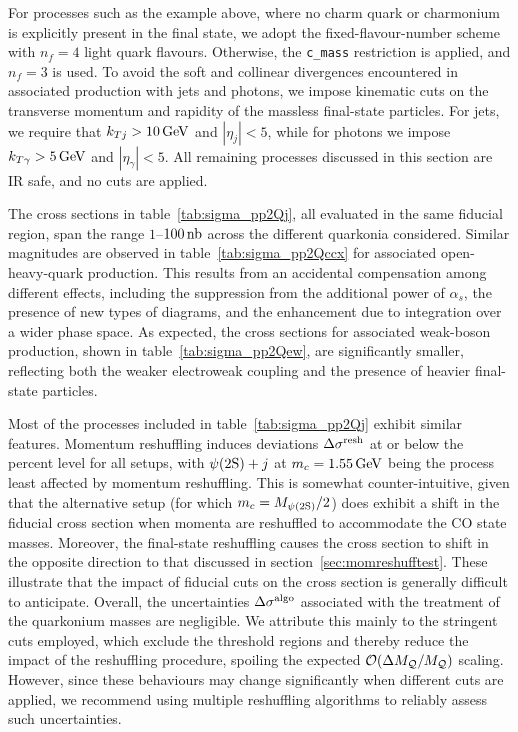 \noindent
For processes such as the example above, where no charm quark or charmonium is explicitly present in the final state, we adopt the fixed-flavour-number scheme with $n_f = 4$ light quark flavours. Otherwise, the {\tt c\_mass} restriction is applied, and $n_f = 3$ is used.
To avoid the soft and collinear divergences encountered in associated production with jets and photons, we impose kinematic cuts on the transverse momentum and rapidity of the massless final-state particles. For jets, we require that $k_{Tj} > 10\,{\rm GeV}$ and $|\eta_j| < 5$, while for photons we impose $k_{T\gamma} > 5\,{\rm GeV}$ and $|\eta_\gamma| < 5$.
All remaining processes discussed in this section are IR safe, and no cuts are applied.

The cross sections in table~\ref{tab:sigma_pp2Qj}, all evaluated in the same fiducial region, span the range $1$--$100\,{\rm nb}$ across the different quarkonia considered. Similar magnitudes are observed in table~\ref{tab:sigma_pp2Qccx} for associated open-heavy-quark production. This results from an accidental compensation among different effects, including the suppression from the additional power of $\alpha_s$, the presence of new types of diagrams, and the enhancement due to integration over a wider phase space.
As expected, the cross sections for associated weak-boson production, shown in table~\ref{tab:sigma_pp2Qew}, are significantly smaller, reflecting both the weaker electroweak coupling and the presence of heavier final-state particles.

Most of the processes included in table~\ref{tab:sigma_pp2Qj} exhibit similar features.
Momentum reshuffling induces deviations 
$\Delta \sigma^{\rm resh}$ at or below the percent level for all setups, with $\psi(2\mathrm{S}) + j$ at $m_c = 1.55\,{\rm GeV}$ being the process least affected by momentum reshuffling. This is somewhat counter-intuitive, given that the alternative setup (for which $m_c = M_{\psi(2\mathrm{S})}/2$) does exhibit a shift in the fiducial cross section when momenta are reshuffled to accommodate the CO state masses. Moreover, the final-state reshuffling causes the cross section to shift in the opposite direction to that discussed in section~\ref{sec:momreshufftest}.
These illustrate that the impact of fiducial cuts on the cross section is generally difficult to anticipate. 
Overall, the uncertainties $\Delta\sigma^{\rm algo}$ associated with the treatment of the quarkonium masses are negligible. We attribute this mainly to the stringent cuts employed, which exclude the threshold regions and thereby reduce the impact of the reshuffling procedure, spoiling the expected ${\cal O}(\Delta M_{\cal Q}/M_{\cal Q})$ scaling.
However, since these behaviours may change significantly when different cuts are applied, we recommend using multiple reshuffling algorithms to reliably assess such uncertainties.

